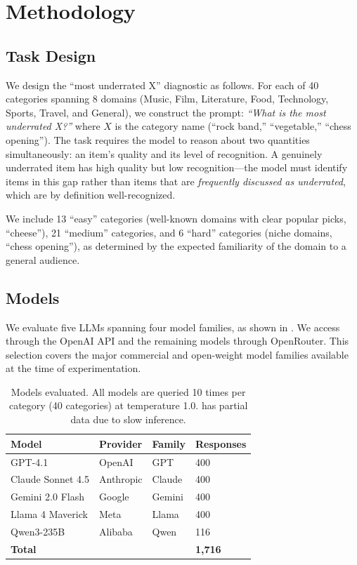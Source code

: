 \section{Methodology}
\label{sec:method}

\subsection{Task Design}
\label{sec:task}

We design the ``most underrated X'' diagnostic as follows. For each of 40 categories spanning 8 domains (Music, Film, Literature, Food, Technology, Sports, Travel, and General), we construct the prompt: \textit{``What is the most underrated X?''} where $X$ is the category name (\eg ``rock band,'' ``vegetable,'' ``chess opening''). The task requires the model to reason about two quantities simultaneously: an item's quality and its level of recognition. A genuinely underrated item has high quality but low recognition---the model must identify items in this gap rather than items that are \textit{frequently discussed as underrated}, which are by definition well-recognized.

We include 13 ``easy'' categories (well-known domains with clear popular picks, \eg ``cheese''), 21 ``medium'' categories, and 6 ``hard'' categories (niche domains, \eg ``chess opening''), as determined by the expected familiarity of the domain to a general audience.

\subsection{Models}

We evaluate five LLMs spanning four model families, as shown in . We access \gptfour through the OpenAI API and the remaining models through OpenRouter. This selection covers the major commercial and open-weight model families available at the time of experimentation.

\begin{table}[t]
    \centering
    \caption{Models evaluated. All models are queried 10 times per category (40 categories) at temperature 1.0. \qwen has partial data due to slow inference.}
    \begin{tabular}{@{}llll@{}}
        \toprule
        \textbf{Model} & \textbf{Provider} & \textbf{Family} & \textbf{Responses} \\
        \midrule
        GPT-4.1 & OpenAI & GPT & 400 \\
        Claude Sonnet 4.5 & Anthropic & Claude & 400 \\
        Gemini 2.0 Flash & Google & Gemini & 400 \\
        Llama 4 Maverick & Meta & Llama & 400 \\
        Qwen3-235B & Alibaba & Qwen & 116 \\
        \midrule
        \textbf{Total} & & & \textbf{1,716} \\
        \bottomrule
    \end{tabular}
    \label{tab:models}
\end{table}

